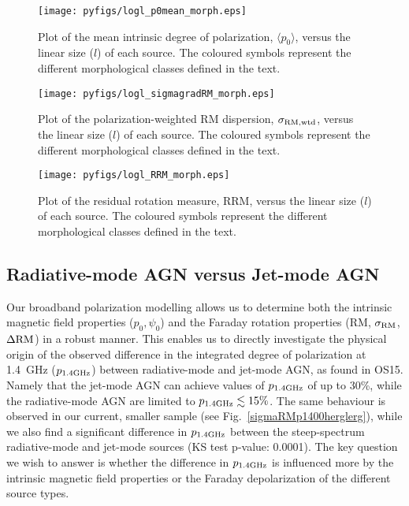\documentclass{mnras}
\newcommand*\sigmaRM{\sigma_{\rm RM}}
\newcommand*\sigmaRMwtd{\sigma_{\rm RM, wtd}}
\newcommand*\DeltaRM{\Delta{\rm RM}}
\begin{document}
\begin{figure} 
\centering
    \texttt{[image: pyfigs/logl\_p0mean\_morph.eps]} 
    \caption{ {\small Plot of the mean intrinsic degree of polarization, $\langle p_0 \rangle$, versus the linear size ($l$) of each source. 
    The coloured symbols represent the different morphological classes defined in the text. } }
    \label{lp0morph}
\end{figure}   

\begin{figure} 
\centering
    \texttt{[image: pyfigs/logl\_sigmagradRM\_morph.eps]} 
    \caption{ {\small Plot of the polarization-weighted RM dispersion, $\sigmaRMwtd$, versus the linear size ($l$) of each source. 
    The coloured symbols represent the different morphological classes defined in the text. } }
    \label{lsigmaRMmorph}
\end{figure}   

\begin{figure} 
\centering
    \texttt{[image: pyfigs/logl\_RRM\_morph.eps]} 
    \caption{ {\small Plot of the residual rotation measure, RRM, versus the linear size ($l$) of each source. 
    The coloured symbols represent the different morphological classes defined in the text. } }
    \label{lRRMmorph}
\end{figure}   


\subsection{Radiative-mode AGN versus Jet-mode AGN} \label{radjetresults}
Our broadband polarization modelling allows us to determine both the intrinsic magnetic field properties ($p_0, \psi_0$) and the Faraday rotation properties (RM, $\sigmaRM$, $\DeltaRM$) in a robust manner. This enables us to directly investigate the physical origin of the observed difference in the integrated degree of polarization at 1.4~GHz ($p_{\rm 1.4 GHz}$) between radiative-mode and jet-mode AGN, as found in OS15. Namely that the jet-mode AGN can achieve values of $p_{\rm 1.4 GHz}$ of up to 30\%, while the radiative-mode AGN are limited to $p_{\rm 1.4 GHz}\lesssim15\%$. 
The same behaviour is observed in our current, smaller sample (see Fig.~\ref{sigmaRMp1400herglerg}), while we also find a significant difference in $p_{\rm 1.4 GHz}$ between the steep-spectrum radiative-mode and jet-mode sources (KS test p-value: 0.0001). 
The key question we wish to answer is whether the difference in $p_{\rm 1.4 GHz}$ is influenced more by the intrinsic magnetic field properties or the Faraday depolarization of the different source types.
\end{document}
